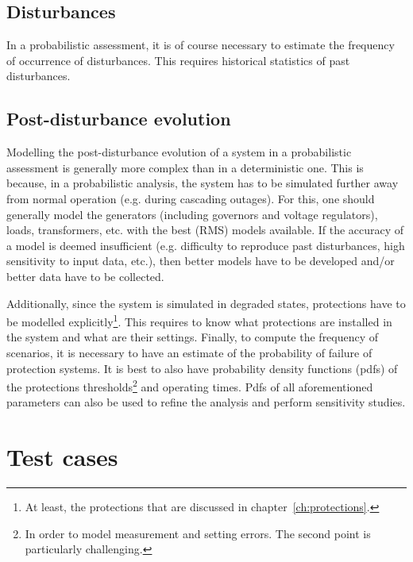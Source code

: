 \subsection{Disturbances}

In a probabilistic assessment, it is of course necessary to estimate the frequency of occurrence of disturbances. This requires historical statistics of past disturbances.

\subsection{Post-disturbance evolution}

Modelling the post-disturbance evolution of a system in a probabilistic assessment is generally more complex than in a deterministic one. This is because, in a probabilistic analysis, the system has to be simulated further away from normal operation (e.g. during cascading outages). For this, one should generally model the generators (including governors and voltage regulators), loads, transformers, etc. with the best (RMS) models available. If the accuracy of a model is deemed insufficient (e.g. difficulty to reproduce past disturbances, high sensitivity to input data, etc.), then better models have to be developed and/or better data have to be collected.

Additionally, since the system is simulated in degraded states, protections have to be modelled explicitly\footnote{At least, the protections that are discussed in chapter~\ref{ch:protections}.}. This requires to know what protections are installed in the system and what are their settings. Finally, to compute the frequency of scenarios, it is necessary to have an estimate of the probability of failure of protection systems. It is best to also have probability density functions (pdfs) of the protections thresholds\footnote{In order to model measurement and setting errors. The second point is particularly challenging.} and operating times. Pdfs of all aforementioned parameters can also be used to refine the analysis and perform sensitivity studies.


\section{Test cases}
\label{sec:testCases}

